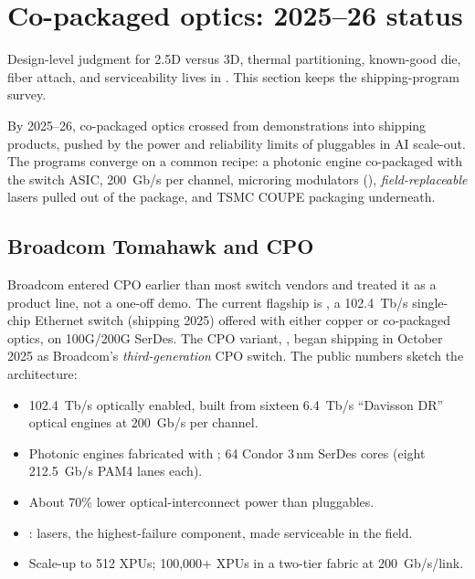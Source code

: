 
\section{Co-packaged optics: 2025--26 status}
\label{sec:cpo-status}

Design-level judgment for 2.5D versus 3D, thermal partitioning, known-good
die, fiber attach, and serviceability lives in . This
section keeps the shipping-program survey.

By 2025--26, co-packaged optics crossed from demonstrations into shipping
products, pushed by the power and reliability limits of pluggables in AI
scale-out. The programs converge on a common recipe: a photonic engine
co-packaged with the switch ASIC, 200~Gb/s per channel, microring modulators
(),
\emph{field-replaceable} lasers pulled out of the package, and TSMC COUPE
packaging underneath.

\subsection{Broadcom Tomahawk and CPO}

Broadcom entered CPO earlier than most switch vendors and treated it as a
product line, not a one-off demo. The current flagship is , a
102.4~Tb/s single-chip Ethernet switch (shipping 2025) offered with either copper
or co-packaged optics, on 100G/200G SerDes. The CPO variant, , began shipping in October
2025 as Broadcom's \emph{third-generation} CPO switch. The public numbers sketch
the architecture:

\begin{itemize}
\item 102.4~Tb/s optically enabled, built from sixteen 6.4~Tb/s ``Davisson DR''
      optical engines at 200~Gb/s per channel.
\item Photonic engines fabricated with ; 64 Condor 3\,nm SerDes
      cores (eight 212.5~Gb/s PAM4 lanes each).
\item About 70\% lower optical-interconnect power than pluggables.
\item {}: lasers, the highest-failure
      component, made serviceable in the field.
\item Scale-up to 512 XPUs; 100{,}000+ XPUs in a two-tier fabric at 200~Gb/s/link.
\end{itemize}

